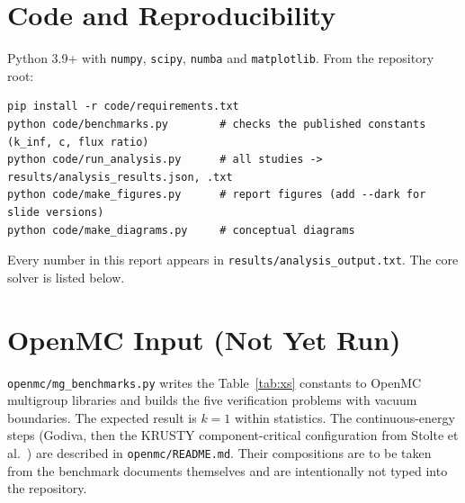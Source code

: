 \documentclass[11pt,letterpaper]{article}
\begin{document}
\section{Code and Reproducibility}
\label{app:code}
Python 3.9+ with \texttt{numpy}, \texttt{scipy}, \texttt{numba} and \texttt{matplotlib}. From the repository root:
\begin{verbatim}
pip install -r code/requirements.txt
python code/benchmarks.py        # checks the published constants (k_inf, c, flux ratio)
python code/run_analysis.py      # all studies -> results/analysis_results.json, .txt
python code/make_figures.py      # report figures (add --dark for slide versions)
python code/make_diagrams.py     # conceptual diagrams
\end{verbatim}
Every number in this report appears in \texttt{results/analysis\_output.txt}. The core solver is listed below.




\section{OpenMC Input (Not Yet Run)}
\label{app:openmc}
\texttt{openmc/mg\_benchmarks.py} writes the Table~\ref{tab:xs} constants to OpenMC multigroup libraries and builds the five verification problems with vacuum boundaries. The expected result is $k = 1$ within statistics. The continuous-energy steps (Godiva, then the KRUSTY component-critical configuration from Stolte et al.\ \citep{Stolte2022}) are described in \texttt{openmc/README.md}. Their compositions are to be taken from the benchmark documents themselves and are intentionally not typed into the repository.
\end{document}
